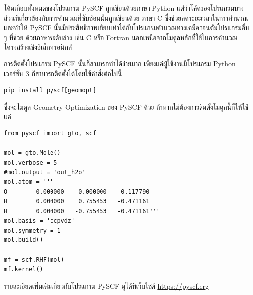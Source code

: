โค้ดเกือบทั้งหมดของโปรแกรม PySCF ถูกเขียนด้วยภาษา Python แต่ว่าโค้ดของโปรแกรมบางส่วนที่เกี่ยวข้องกับการคำนวณที่ซับซ้อนนั้นถูกเขียนด้วย%
ภาษา C ซึ่งช่วยลดระยะเวลาในการคำนวณและทำให้ PySCF นั้นมีประสิทธิภาพเทียบเท่าได้กับโปรแกรมคำนวณทางเคมีควอนตัมโปรแกรมอื่น ๆ ที่ช่วย%
ด้วยภาษาระดับล่าง เช่น C หรือ Fortran นอกเหนือจากโมดูลหลักที่ใช้ในการคำนวณโครงสร้างเชิงอิเล็กทรอนิกส์

การติดตั้งโปรแกรม PySCF นั้นก็สามารถทำได้ง่ายมาก เพียงแค่ผู้ใช้งานมีโปรแกรม Python เวอร์ชั่น 3 ก็สามารถติดตั้งได้โดยใช้คำสั่งต่อไปนี้

\begin{lstlisting}[style=MyBash]
pip install pyscf[geomopt]
\end{lstlisting}

\vspace{1em}
\noindent ซึ่งจะโมดูล Geometry Optimization ของ PySCF ด้วย ถ้าหากไม่ต้องการติดตั้งโมดูลนี้ก็ให้ใช้แค่ 

\begin{lstlisting}[style=plain]
from pyscf import gto, scf

mol = gto.Mole()
mol.verbose = 5
#mol.output = 'out_h2o'
mol.atom = '''
O        0.000000    0.000000    0.117790
H        0.000000    0.755453   -0.471161
H        0.000000   -0.755453   -0.471161'''
mol.basis = 'ccpvdz'
mol.symmetry = 1
mol.build()

mf = scf.RHF(mol)
mf.kernel()
\end{lstlisting}

\vspace{1em}

รายละเอียดเพิ่มเติมเกี่ยวกับโปรแกรม PySCF ดูได้ที่เว็บไซต์ \url{https://pyscf.org}
